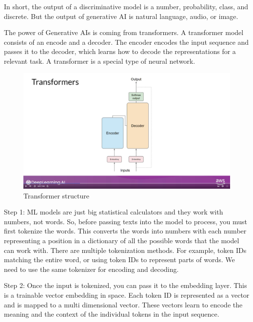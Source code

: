 \documentclass[12pt]{report}
\begin{document}
In short, the output of a discriminative model is a number, probability, class, and discrete. But the output of generative AI is natural language, audio, or image.


The power of Generative AIs is coming from transformers. A transformer model consists of an encode and a decoder. The encoder encodes the input sequence and passes it to the decoder, which learns how to decode the representations for a relevant task. A transformer is a special type of neural network.


\begin{figure}[H]
  \centering
  \caption{Transformer structure}
  \includegraphics[scale=0.2]{pics/transformers.png}
\end{figure}


Step 1:
ML models are just big statistical calculators and they work with numbers, not words. So, before passing texts into the model to process, you must first tokenize the words. This converts the words into numbers with each number representing a position in a dictionary of all the possible words that the model can work with. There are multiple tokenization methods. For example, token IDs matching the entire word, or using token IDs to represent parts of words. We need to use the same tokenizer for encoding and decoding.


Step 2:
Once the input is tokenized, you can pass it to the embedding layer. This is a trainable vector embedding in space. Each token ID is represented as a vector and is mapped to a multi dimensional vector. These vectors learn to encode the meaning and the context of the individual tokens in the input sequence.
\end{document}
